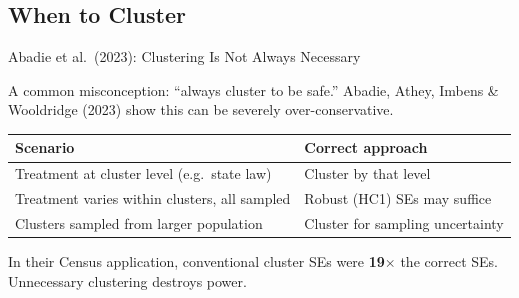 \documentclass[9pt,aspectratio=169]{beamer}
\begin{document}
\subsection{When to Cluster}
\begin{frame}{Abadie et al.\ (2023): Clustering Is Not Always Necessary}

A common misconception: ``always cluster to be safe.'' Abadie, Athey, Imbens \& Wooldridge (2023) show this can be \alert{severely over-conservative}.

\medskip

\begin{tabular}{@{}lp{6.5cm}@{}}
\toprule
\textbf{Scenario} & \textbf{Correct approach} \\
\midrule
Treatment at cluster level (e.g.\ state law) & Cluster by that level \\[0.4em]
Treatment varies within clusters, all sampled & Robust (HC1) SEs may suffice \\[0.4em]
Clusters sampled from larger population & Cluster for sampling uncertainty \\
\bottomrule
\end{tabular}

\medskip

\begin{warningbox}
\centering
In their Census application, conventional cluster SEs were \textbf{19$\times$} the correct SEs. Unnecessary clustering destroys power.
\end{warningbox}

\end{frame}
\end{document}

